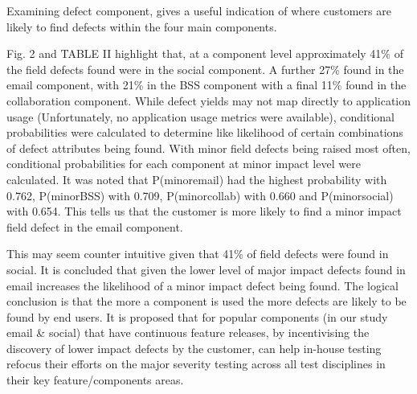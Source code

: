 \documentclass[conference]{IEEEtran}
\begin{document}
Examining defect component, gives a useful indication of where customers are likely to find defects within the four main components. \par
Fig. 2 and TABLE II highlight that, at a component level approximately 41\% of the field defects found were in the social component. A further 27\% found in the email component, with 21\% in the BSS component with a final 11\% found in the collaboration component. While defect yields may not map directly to application usage (Unfortunately, no application usage metrics were available), conditional probabilities were calculated to determine like likelihood of certain combinations of defect attributes being found. With minor field defects being raised most often, conditional probabilities  for each component at minor impact level were calculated. It was noted that  P(minor\textbar email) had the highest probability with 0.762, P(minor\textbar BSS) with 0.709, P(minor\textbar collab) with 0.660 and P(minor\textbar social) with 0.654. This tells us that the customer is more likely to find a minor impact field defect in the email component. \par
This may seem counter intuitive given that 41\% of field defects were found in social. It is concluded that given the lower level of major impact defects found in email increases the likelihood of a minor impact defect being found.  The logical conclusion is that the more a component is used the more defects are likely to be found by end users. It is proposed that for popular components (in our study email \& social) that have continuous feature releases, by incentivising the discovery of lower impact defects by the customer, can help in-house testing refocus their efforts on the major severity testing across all test disciplines in their key feature/components areas. 
\end{document}
